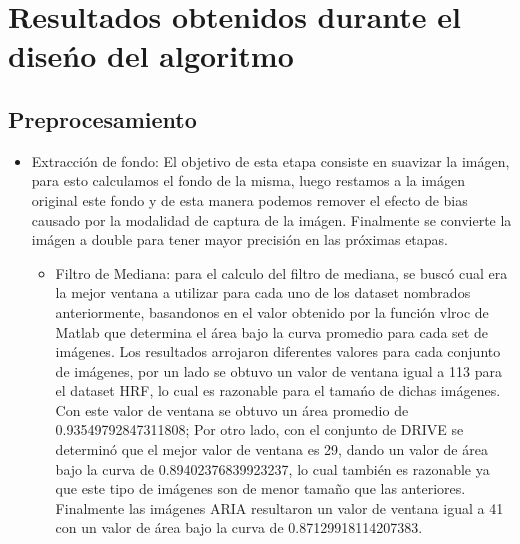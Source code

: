 
\section{Resultados obtenidos durante el dise\'no del algoritmo}


\subsection{Preprocesamiento}
\begin{itemize}
\item Extracci\'on de fondo: El objetivo de esta etapa consiste en suavizar la im\'agen, para esto calculamos el fondo de la misma, luego  restamos a la im\'agen original este fondo y de esta manera podemos remover el efecto de bias causado por la modalidad de captura de la im\'agen. Finalmente se convierte la im\'agen a double para tener mayor precisi\'on en las pr\'oximas etapas.
	\begin{itemize}
		\item Filtro de Mediana: para el calculo del filtro de mediana, se busc\'o cual era la mejor ventana a utilizar para cada uno de los dataset nombrados anteriormente, basandonos en el valor obtenido por la funci\'on vlroc de Matlab que determina el \'area bajo la curva promedio para cada set de im\'agenes. Los resultados arrojaron diferentes valores para cada conjunto de im\'agenes, por un lado se obtuvo un valor de ventana igual a 113 para el dataset HRF, lo cual es razonable para el tama\'no de dichas im\'agenes. Con este valor de ventana se obtuvo un \'area promedio de 0.93549792847311808; Por otro lado, con el conjunto de DRIVE se determin\'o que el mejor valor de ventana es 29, dando un valor de \'area bajo la curva de 0.89402376839923237,  lo cual tambi\'en es razonable ya que este tipo de im\'agenes son de menor tama\~no que las anteriores. Finalmente las im\'agenes ARIA resultaron un valor de ventana igual a 41 con un valor de \'area bajo la curva de 0.87129918114207383.
		

\end{itemize}
\end{itemize}
